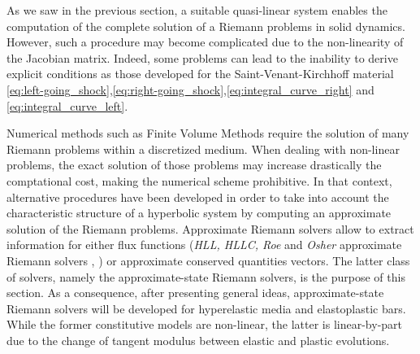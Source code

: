 As we saw in the previous section, a suitable quasi-linear system enables the computation of the complete solution of a Riemann problems in solid dynamics. However, such a procedure may become complicated due to the non-linearity of the Jacobian matrix. Indeed, some problems can lead to the inability to derive explicit conditions as those developed for the Saint-Venant-Kirchhoff material \eqref{eq:left-going_shock},\eqref{eq:right-going_shock},\eqref{eq:integral_curve_right} and \eqref{eq:integral_curve_left}.

Numerical methods such as Finite Volume Methods \cite{Leveque} require the solution of many Riemann problems within a discretized medium. When dealing with non-linear problems, the exact solution of those problems may increase drastically the comptational cost, making the numerical scheme prohibitive. In that context, alternative procedures have been developed in order to take into account the characteristic structure of a hyperbolic system by computing an approximate solution of the Riemann problems. Approximate Riemann solvers allow to extract information for either flux functions (\textit{HLL, HLLC, Roe} and \textit{Osher} approximate Riemann solvers \cite{Trangenstein}, \cite{Toro}) or approximate conserved quantities vectors. The latter class of solvers, namely the approximate-state Riemann solvers, is the purpose of this section. As a consequence, after presenting general ideas, approximate-state Riemann solvers will be developed for hyperelastic media and elastoplastic bars. While the former constitutive models are non-linear, the latter is linear-by-part due to the change of tangent modulus between elastic and plastic evolutions.

